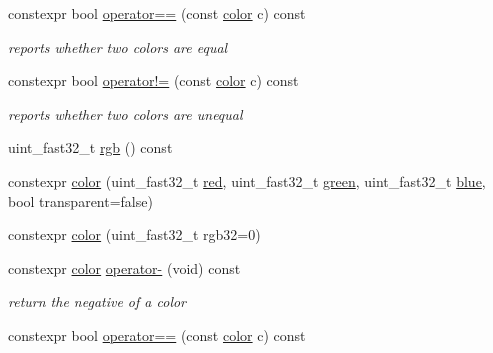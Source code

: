 \begin{DoxyCompactItemize}
\mbox{\label{classhwlib_1_1color_a3d40dc7bb1585a139e28ca29fa77d5ac}} 
constexpr bool \hyperlink{classhwlib_1_1color_a3d40dc7bb1585a139e28ca29fa77d5ac}{operator==} (const \hyperlink{classhwlib_1_1color}{color} c) const
\begin{DoxyCompactList}\small\item\em reports whether two colors are equal \end{DoxyCompactList}\item 
\mbox{\label{classhwlib_1_1color_af4c0560e4fbd233b4a2fbc922ed5528a}} 
constexpr bool \hyperlink{classhwlib_1_1color_af4c0560e4fbd233b4a2fbc922ed5528a}{operator!=} (const \hyperlink{classhwlib_1_1color}{color} c) const
\begin{DoxyCompactList}\small\item\em reports whether two colors are unequal \end{DoxyCompactList}\item 
uint\+\_\+fast32\+\_\+t \hyperlink{classhwlib_1_1color_a845e1e2526d372640adb44cf98e8f3f4}{rgb} () const
\item 
constexpr \hyperlink{classhwlib_1_1color_a35fd6b9a03fa8f5b78bbf55052760bd3}{color} (uint\+\_\+fast32\+\_\+t \hyperlink{classhwlib_1_1color_a63b0cdaa1bc446995cc8b8724a2ab866}{red}, uint\+\_\+fast32\+\_\+t \hyperlink{classhwlib_1_1color_ab87f25b9aba71151e056b570e7304c89}{green}, uint\+\_\+fast32\+\_\+t \hyperlink{classhwlib_1_1color_a9d57edec257fb2626157befb791a6a96}{blue}, bool transparent=false)
\item 
constexpr \hyperlink{classhwlib_1_1color_aa8d2263ebf5efe2221171217166a669f}{color} (uint\+\_\+fast32\+\_\+t rgb32=0)
\item 
\mbox{\label{classhwlib_1_1color_a6461f61a4b0e1b5058b765eed55aeec7}} 
constexpr \hyperlink{classhwlib_1_1color}{color} \hyperlink{classhwlib_1_1color_a6461f61a4b0e1b5058b765eed55aeec7}{operator-\/} (void) const
\begin{DoxyCompactList}\small\item\em return the negative of a color \end{DoxyCompactList}\item 
\mbox{\label{classhwlib_1_1color_a3d40dc7bb1585a139e28ca29fa77d5ac}} 
constexpr bool \hyperlink{classhwlib_1_1color_a3d40dc7bb1585a139e28ca29fa77d5ac}{operator==} (const \hyperlink{classhwlib_1_1color}{color} c) const

\end{DoxyCompactItemize}
